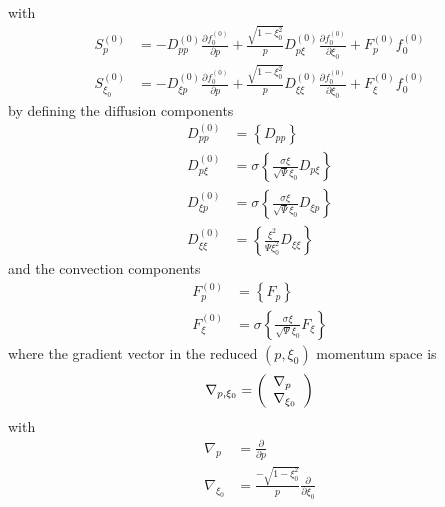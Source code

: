 with
\begin{align}
S_{p}^{(0)}  & =-D_{pp}^{(0)}\frac{\partial f_{0}^{(0)}}{\partial p}%
+\frac{\sqrt{1-\xi_{0}^{2}}}{p}D_{p\xi}^{(0)}\frac{\partial f_{0}^{(0)}%
}{\partial\xi_{0}}+F_{p}^{(0)}f_{0}^{(0)}\label{sp0dev}\\
S_{\xi_{0}}^{(0)}  & =-D_{\xi p}^{(0)}\frac{\partial f_{0}^{(0)}}{\partial
p}+\frac{\sqrt{1-\xi_{0}^{2}}}{p}D_{\xi\xi}^{(0)}\frac{\partial f_{0}^{(0)}%
}{\partial\xi_{0}}+F_{\xi}^{(0)}f_{0}^{(0)}%
\end{align}
by defining the diffusion components
\begin{align}
D_{pp}^{(0)}  & =\left\{  D_{pp}\right\}  \label{diffbavpp}\\
D_{p\xi}^{(0)}  & =\sigma\left\{  \frac{\sigma\xi}{\sqrt{\Psi}\xi_{0}}D_{p\xi
}\right\}  \label{diffbavpm}\\
D_{\xi p}^{(0)}  & =\sigma\left\{  \frac{\sigma\xi}{\sqrt{\Psi}\xi_{0}}D_{\xi
p}\right\}  \label{diffbavmp}\\
D_{\xi\xi}^{(0)}  & =\left\{  \frac{\xi^{2}}{\Psi\xi_{0}^{2}}D_{\xi\xi
}\right\}  \label{diffbavmm}%
\end{align}
and the convection components
\begin{align}
F_{p}^{(0)}  & =\left\{  F_{p}\right\}  \label{convbavp}\\
F_{\xi}^{(0)}  & =\sigma\left\{  \frac{\sigma\xi}{\sqrt{\Psi}\xi_{0}}F_{\xi
}\right\}  \label{convbavm}%
\end{align}
where the gradient vector in the reduced $\left(  p,\xi_{0}\right)  $ momentum
space is
\begin{equation}
\nabla_{p,\xi_{0}}=\left(
\begin{array}
[c]{l}%
\nabla_{p}\\
\nabla_{\xi_{0}}%
\end{array}
\right)
\end{equation}
with
\begin{align}
\nabla_{p}  & =\frac{\partial}{\partial p}\\
\nabla_{\xi_{0}}  & =\frac{-\sqrt{1-\xi_{0}^{2}}}{p}\frac{\partial}%
{\partial\xi_{0}}%
\end{align}
